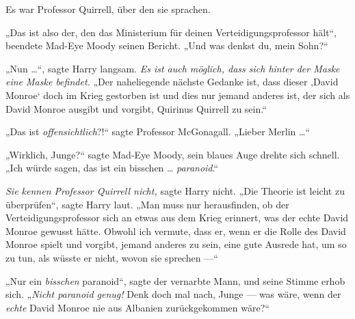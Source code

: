 Es war Professor Quirrell, über den sie sprachen.

„Das ist also der, den das Ministerium für deinen Verteidigungsprofessor hält“, beendete Mad-Eye Moody seinen Bericht.
„Und was denkst du, mein Sohn?“

„Nun …“, sagte Harry langsam. \emph{Es ist auch möglich, dass sich hinter der Maske eine Maske befindet.}
„Der naheliegende nächste Gedanke ist, dass dieser ‚David Monroe‘ doch im Krieg gestorben ist und dies nur jemand anderes ist, der sich als David Monroe ausgibt und vorgibt, Quirinus Quirrell zu sein.“

„Das ist \emph{offensichtlich}?!“ sagte Professor McGonagall.
„Lieber Merlin …“

„Wirklich, Junge?“ sagte Mad-Eye Moody, sein blaues Auge drehte sich schnell.
„Ich würde sagen, das ist ein bisschen … \emph{paranoid}.“

\emph{Sie kennen Professor Quirrell nicht,} sagte Harry nicht.
„Die Theorie ist leicht zu überprüfen“, sagte Harry laut.
„Man muss nur herausfinden, ob der Verteidigungsprofessor sich an etwas aus dem Krieg erinnert, was der echte David Monroe gewusst hätte. Obwohl ich vermute, dass er, wenn er die Rolle des David Monroe spielt und vorgibt, jemand anderes zu sein, eine gute Ausrede hat, um so zu tun, als wüsste er nicht, wovon sie sprechen —“

„Nur ein \emph{bisschen} paranoid“, sagte der vernarbte Mann, und seine Stimme erhob sich.
„\emph{Nicht paranoid genug! } Denk doch mal nach, Junge — was wäre, wenn der \emph{echte} David Monroe nie aus Albanien zurückgekommen wäre?“


